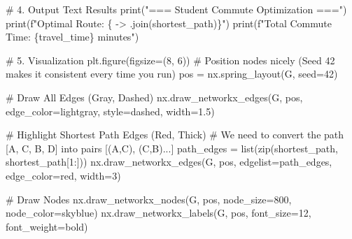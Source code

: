 \documentclass[
  letterpaper,
  DIV=11,
  numbers=noendperiod]{scrreprt}
\newenvironment{Shaded}{\begin{snugshade}}{\end{snugshade}}
\newcommand{\BuiltInTok}[1]{\textcolor[rgb]{0.00,0.23,0.31}{#1}}
\newcommand{\CommentTok}[1]{\textcolor[rgb]{0.37,0.37,0.37}{#1}}
\newcommand{\DecValTok}[1]{\textcolor[rgb]{0.68,0.00,0.00}{#1}}
\newcommand{\FloatTok}[1]{\textcolor[rgb]{0.68,0.00,0.00}{#1}}
\newcommand{\NormalTok}[1]{\textcolor[rgb]{0.00,0.23,0.31}{#1}}
\newcommand{\OperatorTok}[1]{\textcolor[rgb]{0.37,0.37,0.37}{#1}}
\newcommand{\SpecialCharTok}[1]{\textcolor[rgb]{0.37,0.37,0.37}{#1}}
\newcommand{\SpecialStringTok}[1]{\textcolor[rgb]{0.13,0.47,0.30}{#1}}
\newcommand{\StringTok}[1]{\textcolor[rgb]{0.13,0.47,0.30}{#1}}
\begin{document}
\begin{Shaded}
\begin{Highlighting}[]
\CommentTok{\# 4. Output Text Results}
\BuiltInTok{print}\NormalTok{(}\StringTok{"=== Student Commute Optimization ==="}\NormalTok{)}
\BuiltInTok{print}\NormalTok{(}\SpecialStringTok{f"Optimal Route: }\SpecialCharTok{\{}\StringTok{\textquotesingle{} {-}\textgreater{} \textquotesingle{}}\SpecialCharTok{.}\NormalTok{join(shortest\_path)}\SpecialCharTok{\}}\SpecialStringTok{"}\NormalTok{)}
\BuiltInTok{print}\NormalTok{(}\SpecialStringTok{f"Total Commute Time: }\SpecialCharTok{\{}\NormalTok{travel\_time}\SpecialCharTok{\}}\SpecialStringTok{ minutes"}\NormalTok{)}

\CommentTok{\# 5. Visualization}
\NormalTok{plt.figure(figsize}\OperatorTok{=}\NormalTok{(}\DecValTok{8}\NormalTok{, }\DecValTok{6}\NormalTok{))}
\CommentTok{\# Position nodes nicely (Seed 42 makes it consistent every time you run)}
\NormalTok{pos }\OperatorTok{=}\NormalTok{ nx.spring\_layout(G, seed}\OperatorTok{=}\DecValTok{42}\NormalTok{)}

\CommentTok{\# Draw All Edges (Gray, Dashed)}
\NormalTok{nx.draw\_networkx\_edges(G, pos, edge\_color}\OperatorTok{=}\StringTok{\textquotesingle{}lightgray\textquotesingle{}}\NormalTok{, style}\OperatorTok{=}\StringTok{\textquotesingle{}dashed\textquotesingle{}}\NormalTok{, width}\OperatorTok{=}\FloatTok{1.5}\NormalTok{)}

\CommentTok{\# Highlight Shortest Path Edges (Red, Thick)}
\CommentTok{\# We need to convert the path [\textquotesingle{}A\textquotesingle{}, \textquotesingle{}C\textquotesingle{}, \textquotesingle{}B\textquotesingle{}, \textquotesingle{}D\textquotesingle{}] into pairs [(\textquotesingle{}A\textquotesingle{},\textquotesingle{}C\textquotesingle{}), (\textquotesingle{}C\textquotesingle{},\textquotesingle{}B\textquotesingle{})...]}
\NormalTok{path\_edges }\OperatorTok{=} \BuiltInTok{list}\NormalTok{(}\BuiltInTok{zip}\NormalTok{(shortest\_path, shortest\_path[}\DecValTok{1}\NormalTok{:]))}
\NormalTok{nx.draw\_networkx\_edges(G, pos, edgelist}\OperatorTok{=}\NormalTok{path\_edges, edge\_color}\OperatorTok{=}\StringTok{\textquotesingle{}red\textquotesingle{}}\NormalTok{, width}\OperatorTok{=}\DecValTok{3}\NormalTok{)}

\CommentTok{\# Draw Nodes}
\NormalTok{nx.draw\_networkx\_nodes(G, pos, node\_size}\OperatorTok{=}\DecValTok{800}\NormalTok{, node\_color}\OperatorTok{=}\StringTok{\textquotesingle{}skyblue\textquotesingle{}}\NormalTok{)}
\NormalTok{nx.draw\_networkx\_labels(G, pos, font\_size}\OperatorTok{=}\DecValTok{12}\NormalTok{, font\_weight}\OperatorTok{=}\StringTok{\textquotesingle{}bold\textquotesingle{}}\NormalTok{)}


\end{Highlighting}
\end{Shaded}
\end{document}
